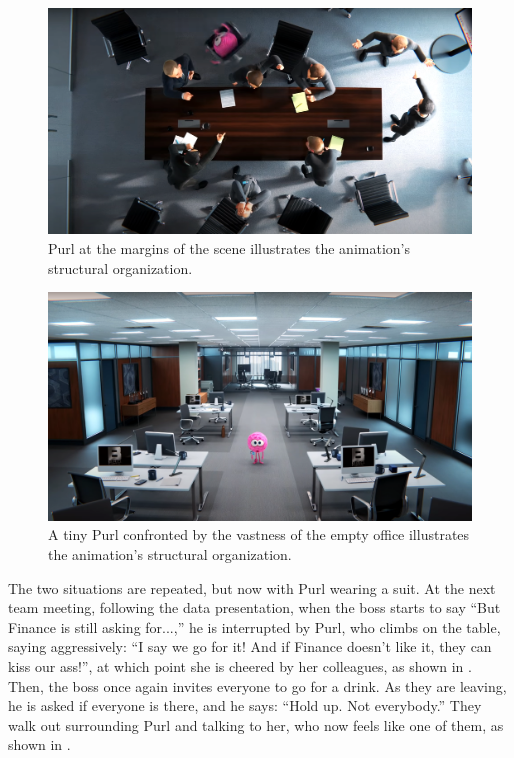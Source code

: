 \documentclass[english]{textolivre}
\begin{document}
\begin{figure}[htbp]
\centering
\begin{minipage}{.7\textwidth}
 \includegraphics[width=\textwidth]{Fig4.png}
 \caption{Purl at the margins of the scene illustrates the animation’s structural organization.}
 \label{fig4}
\end{minipage}
\end{figure}

\begin{figure}[htbp]
\centering
\begin{minipage}{.7\textwidth}
 \includegraphics[width=\textwidth]{Fig5.png}
 \caption{A tiny Purl confronted by the vastness of the empty office illustrates the animation’s structural organization.}
 \label{fig5}
\end{minipage}
\end{figure}

The two situations are repeated, but now with Purl wearing a suit. At the next team meeting, following the data presentation, when the boss starts to say “But Finance is still asking for...,” he is interrupted by Purl, who climbs on the table, saying aggressively: “I say we go for it! And if Finance doesn’t like it, they can kiss our ass!”, at which point she is cheered by her colleagues, as shown in . Then, the boss once again invites everyone to go for a drink. As they are leaving, he is asked if everyone is there, and he says: “Hold up. Not everybody.” They walk out surrounding Purl and talking to her, who now feels like one of them, as shown in .
\end{document}

